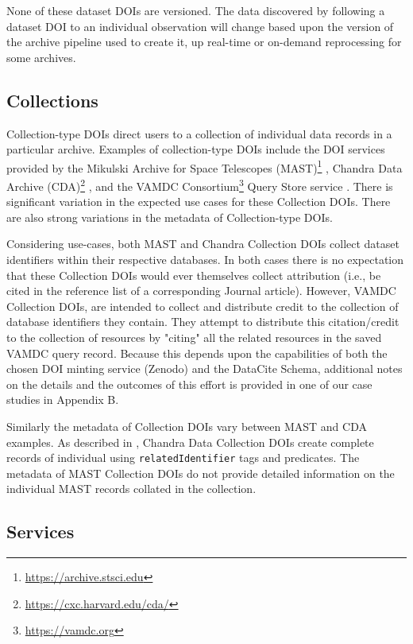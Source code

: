 \documentclass[11pt,a4paper]{ivoa}
\begin{document}
None of these dataset DOIs are versioned. 
The data discovered by following a dataset DOI to an individual observation will change based upon the version of the archive pipeline used to create it, up real-time or on-demand reprocessing for some archives.


\subsection{Collections}
\label{sec:intro:collections}


Collection-type DOIs direct users to a collection of individual data records in a particular archive.
Examples of collection-type DOIs include the DOI services provided by the Mikulski Archive for Space Telescopes (MAST)\footnote{\url{https://archive.stsci.edu}} \citep{2018ApJS..236...20N}, Chandra Data Archive (CDA)\footnote{\url{https://cxc.harvard.edu/cda/}} \citep{2018EPJWC.18612011R}, and the VAMDC Consortium\footnote{\url{https://vamdc.org}} Query Store service \citep{2018Galax...6..105M}.  
There is significant variation in the expected use cases for these Collection DOIs. 
There are also strong variations in the metadata of Collection-type DOIs.

Considering use-cases, both MAST and Chandra Collection DOIs collect dataset identifiers within their respective databases.
In both cases there is no expectation that these Collection DOIs would ever themselves collect attribution (i.e., be cited in the reference list of a corresponding Journal article).
However, VAMDC Collection DOIs, are intended to collect and distribute credit to the collection of database identifiers they contain.
They attempt to distribute this citation/credit to the collection of resources by "citing" all the related resources in the saved VAMDC query record.
Because this depends upon the capabilities of both the chosen DOI minting service (Zenodo) and the DataCite Schema, additional notes on the details and the outcomes of this effort is provided in one of our case studies in Appendix B. 

Similarly the metadata of Collection DOIs vary between MAST and CDA examples. 
As described in \citet{2023ChNew..34....5D}, Chandra Data Collection DOIs create complete records of individual using \texttt{relatedIdentifier} tags and predicates. 
The metadata of MAST Collection DOIs do not provide detailed information on the individual MAST records collated in the collection.



\subsection{Services}
\label{sec:intro:services}
\end{document}
